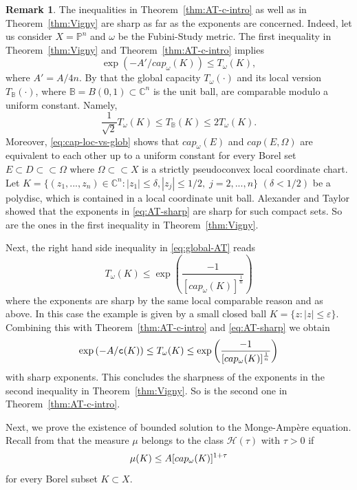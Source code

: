 \documentclass{amsart}
\newcommand{\veps}{\varepsilon}
\newcommand{\de}{\delta}
\newcommand{\om}{\omega}
\newcommand{\tc}{{\tt c}}
\newcommand{\Om}{\Omega}
\newcommand{\cH}{\mathcal{H}}
\newcommand{\bB}{\mathbb{B}}
\newcommand{\bP}{\mathbb{P}}
\newcommand{\bC}{\mathbb{C}}
\theoremstyle{definition}
\newtheorem{remark}[thm]{Remark}
\numberwithin{thm}{section}
\numberwithin{equation}{section}
\renewcommand{\[}{\begin{equation}}
\renewcommand{\]}{\end{equation}}
\begin{document}
\begin{remark}\label{rmk:sharp-ineq} The inequalities in Theorem~\ref{thm:AT-c-intro}  as well as in  Theorem~\ref{thm:Vigny} are sharp as far as the exponents are concerned. Indeed,  let us consider $X = \bP^n$ and $\om$ be the Fubini-Study metric. The first inequality in Theorem~\ref{thm:Vigny} and Theorem~\ref{thm:AT-c-intro} implies
\[ \label{eq:AT-sharp}
	\exp\left( - A'/ cap_\om (K)\right) \leq T_\om(K),
\]
where $A' = A/4n$.
 By \cite[Example~9.22]{GZ-book} that the global capacity $T_\om (\cdot)$ and its local version $T_{\bB} (\cdot)$, where $\bB = B(0,1) \subset \bC^n$ is the unit ball, are comparable modulo a uniform constant. Namely,
 $$
 	\frac{1}{\sqrt{2}} T_\om(K) \leq T_{\bB}(K) \leq 2 T_\om(K).
 $$
  Moreover,  \eqref{eq:cap-loc-vs-glob} shows that $cap_\om(E)$ and $cap (E, \Om)$ are equivalent to each other up to a uniform constant for every Borel set $E \subset D \subset \subset \Om$ where $\Om \subset \subset X$ is a strictly pseudoconvex local coordinate chart. Let  $K = \{ (z_1,...,z_n)\in \bC^n: |z_1| \leq \de, |z_j|\leq 1/2, \; j=2,...,n\}$ $(\de<1/2)$ be  a polydisc, which is contained in a local coordinate unit ball.  Alexander and Taylor \cite[Remark~2]{AT84} showed that the exponents in \eqref{eq:AT-sharp} are sharp for such compact sets. So are the ones in the first inequality in Theorem~\ref{thm:Vigny}.
 
Next, the right hand side inequality in \eqref{eq:global-AT} reads
$$	
	T_\om(K) \leq \exp\left( \frac{-1}{ [cap_\om(K)]^\frac{1}{n}} \right)
$$
where the exponents are sharp by the same local comparable reason and \cite[Remark~2]{AT84} as above. In this case the example is given by a small closed ball $K = \{z: |z|\leq \veps\}$. Combining this with Theorem~\ref{thm:AT-c-intro}  and \eqref{eq:AT-sharp} we obtain 
$$
	\exp\left( - A / \tc (K)\right) \leq T_\om(K) \leq  \exp\left( \frac{-1}{ [cap_\om(K)]^\frac{1}{n}} \right)
$$
with sharp exponents. This concludes the sharpness of the exponents in the second inequality in  Theorem~\ref{thm:Vigny}. So is the second one in Theorem~\ref{thm:AT-c-intro}.
\end{remark}


Next, we prove the existence of bounded solution to the Monge-Amp\`ere equation. Recall from \cite[Definition~1.3]{EGZ09} that the measure $\mu$ belongs to the class $\cH(\tau)$ with $\tau>0$ if
\[\notag
	\mu(K) \leq A [cap_\om(K)]^{1+\tau}
\]
for every Borel subset $K\subset X$.
\end{document}
